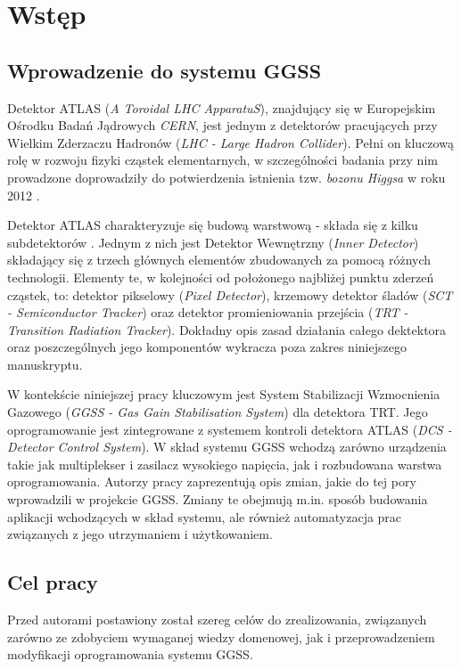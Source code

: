 \chapter{Wstęp}
\label{cha:wstep}

\section{Wprowadzenie do systemu GGSS}
Detektor ATLAS (\textit{A Toroidal LHC ApparatuS}), znajdujący się w Europejskim Ośrodku Badań Jądrowych \textit{CERN}, jest jednym z detektorów pracujących przy Wielkim Zderzaczu Hadronów (\textit{LHC - Large Hadron Collider}). Pełni on kluczową rolę w rozwoju fizyki cząstek elementarnych, w szczególności badania przy nim prowadzone doprowadziły do potwierdzenia istnienia tzw. \textit{bozonu Higgsa} w roku 2012 \cite{AtlasWikipedia}. \par

Detektor ATLAS charakteryzuje się budową warstwową - składa się z kilku subdetektorów \cite{AtlasAGH}. Jednym z nich jest Detektor Wewnętrzny (\textit{Inner Detector}) składający się z trzech głównych elementów zbudowanych za pomocą różnych technologii. Elementy te, w kolejności od położonego najbliżej punktu zderzeń cząstek, to: detektor pikselowy (\textit{Pixel Detector}), krzemowy detektor śladów (\textit{SCT - Semiconductor Tracker}) oraz detektor promieniowania przejścia (\textit{TRT - Transition Radiation Tracker}). Dokładny opis zasad działania całego dektektora oraz poszczególnych jego komponentów wykracza poza zakres niniejszego manuskryptu.\par

W kontekście niniejszej pracy kluczowym jest System Stabilizacji Wzmocnienia Gazowego (\textit{GGSS - Gas Gain Stabilisation System}) dla detektora TRT. Jego oprogramowanie jest zintegrowane \cite{AtlasAGH} z systemem kontroli detektora ATLAS (\textit{DCS - Detector Control System}). W skład systemu GGSS wchodzą zarówno urządzenia takie jak multiplekser i zasilacz wysokiego napięcia, jak i rozbudowana warstwa oprogramowania. Autorzy pracy zaprezentują opis zmian, jakie do tej pory wprowadzili w projekcie GGSS. Zmiany te obejmują m.in. sposób budowania aplikacji wchodzących w skład systemu, ale również automatyzacja prac związanych z jego utrzymaniem i użytkowaniem.



\section{Cel pracy}
Przed autorami postawiony został szereg celów do zrealizowania, związanych zarówno ze zdobyciem wymaganej wiedzy domenowej, jak i przeprowadzeniem modyfikacji oprogramowania systemu GGSS. \par

